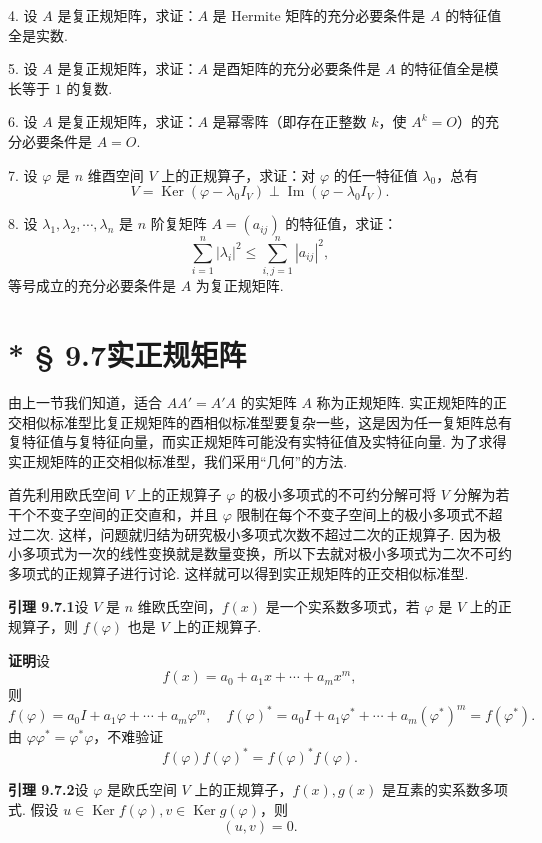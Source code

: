 \documentclass[UTF8, 12pt, fontset=fandol, oneside]{ctexart}
\begin{document}
4. 设 $A$ 是复正规矩阵，求证：$A$ 是 Hermite 矩阵的充分必要条件是 $A$ 的特征值全是实数.

5. 设 $A$ 是复正规矩阵，求证：$A$ 是酉矩阵的充分必要条件是 $A$ 的特征值全是模长等于 $1$ 的复数.

6. 设 $A$ 是复正规矩阵，求证：$A$ 是幂零阵（即存在正整数 $k$，使 $A^k=O$）的充分必要条件是 $A=O$.

7. 设 $\varphi$ 是 $n$ 维酉空间 $V$ 上的正规算子，求证：对 $\varphi$ 的任一特征值 $\lambda_0$，总有
\[
  V=\operatorname{Ker}(\varphi-\lambda_0 I_V)\perp \operatorname{Im}(\varphi-\lambda_0 I_V).
\]

8. 设 $\lambda_1,\lambda_2,\cdots,\lambda_n$ 是 $n$ 阶复矩阵 $A=(a_{ij})$ 的特征值，求证：
\[
  \sum_{i=1}^n|\lambda_i|^2\le \sum_{i,j=1}^n|a_{ij}|^2,
\]
等号成立的充分必要条件是 $A$ 为复正规矩阵.

\section*{* § 9.7\quad 实正规矩阵}

由上一节我们知道，适合 $AA'=A'A$ 的实矩阵 $A$ 称为正规矩阵. 实正规矩阵的正交相似标准型比复正规矩阵的酉相似标准型要复杂一些，这是因为任一复矩阵总有复特征值与复特征向量，而实正规矩阵可能没有实特征值及实特征向量. 为了求得实正规矩阵的正交相似标准型，我们采用“几何”的方法.

首先利用欧氏空间 $V$ 上的正规算子 $\varphi$ 的极小多项式的不可约分解可将 $V$ 分解为若干个不变子空间的正交直和，并且 $\varphi$ 限制在每个不变子空间上的极小多项式不超过二次. 这样，问题就归结为研究极小多项式次数不超过二次的正规算子. 因为极小多项式为一次的线性变换就是数量变换，所以下去就对极小多项式为二次不可约多项式的正规算子进行讨论. 这样就可以得到实正规矩阵的正交相似标准型.

\noindent\textbf{引理 9.7.1}\quad 设 $V$ 是 $n$ 维欧氏空间，$f(x)$ 是一个实系数多项式，若 $\varphi$ 是 $V$ 上的正规算子，则 $f(\varphi)$ 也是 $V$ 上的正规算子.

\noindent\textbf{证明}\quad 设
\[
  f(x)=a_0+a_1x+\cdots+a_mx^m,
\]
则
\[
  f(\varphi)=a_0I+a_1\varphi+\cdots+a_m\varphi^m,\quad
  f(\varphi)^*=a_0I+a_1\varphi^*+\cdots+a_m(\varphi^*)^m=f(\varphi^*).
\]
由 $\varphi\varphi^*=\varphi^*\varphi$，不难验证
\[
  f(\varphi)f(\varphi)^*=f(\varphi)^*f(\varphi).
\]

\noindent\textbf{引理 9.7.2}\quad 设 $\varphi$ 是欧氏空间 $V$ 上的正规算子，$f(x),g(x)$ 是互素的实系数多项式. 假设 $u\in\operatorname{Ker} f(\varphi),v\in\operatorname{Ker} g(\varphi)$，则
\[
  (u,v)=0.
\]
\end{document}
